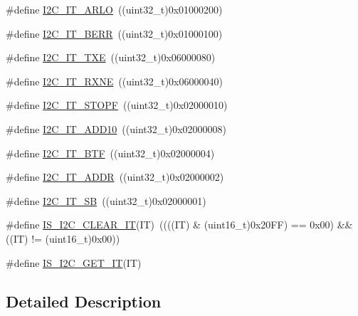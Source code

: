 \begin{DoxyCompactItemize}
\#define \mbox{\hyperlink{group___i2_c__interrupts__definition_ga2439154bee2a45a4147921cec18177d1}{I2\+C\+\_\+\+I\+T\+\_\+\+A\+R\+LO}}~((uint32\+\_\+t)0x01000200)
\item 
\#define \mbox{\hyperlink{group___i2_c__interrupts__definition_gad9aec016c98df6dbb95a5c10b180c202}{I2\+C\+\_\+\+I\+T\+\_\+\+B\+E\+RR}}~((uint32\+\_\+t)0x01000100)
\item 
\#define \mbox{\hyperlink{group___i2_c__interrupts__definition_gacb41229da2cd9460c3272cfb13aa29d3}{I2\+C\+\_\+\+I\+T\+\_\+\+T\+XE}}~((uint32\+\_\+t)0x06000080)
\item 
\#define \mbox{\hyperlink{group___i2_c__interrupts__definition_gac95135720c0de2fd01c44c3f7b6c81d4}{I2\+C\+\_\+\+I\+T\+\_\+\+R\+X\+NE}}~((uint32\+\_\+t)0x06000040)
\item 
\#define \mbox{\hyperlink{group___i2_c__interrupts__definition_ga741e098abb485b327c7668518117e415}{I2\+C\+\_\+\+I\+T\+\_\+\+S\+T\+O\+PF}}~((uint32\+\_\+t)0x02000010)
\item 
\#define \mbox{\hyperlink{group___i2_c__interrupts__definition_ga8a9bc5a1dee3bbd41347b19cf117c0f3}{I2\+C\+\_\+\+I\+T\+\_\+\+A\+D\+D10}}~((uint32\+\_\+t)0x02000008)
\item 
\#define \mbox{\hyperlink{group___i2_c__interrupts__definition_gaef469fef934f655614b7cffd00b87ceb}{I2\+C\+\_\+\+I\+T\+\_\+\+B\+TF}}~((uint32\+\_\+t)0x02000004)
\item 
\#define \mbox{\hyperlink{group___i2_c__interrupts__definition_gaf68f1eda33dcb13626597f477d044025}{I2\+C\+\_\+\+I\+T\+\_\+\+A\+D\+DR}}~((uint32\+\_\+t)0x02000002)
\item 
\#define \mbox{\hyperlink{group___i2_c__interrupts__definition_gaec2fb9bbd0e1b128b4450b2a7b312896}{I2\+C\+\_\+\+I\+T\+\_\+\+SB}}~((uint32\+\_\+t)0x02000001)
\item 
\#define \mbox{\hyperlink{group___i2_c__interrupts__definition_ga368c05fc9aadd7bb4d23280791b5a751}{I\+S\+\_\+\+I2\+C\+\_\+\+C\+L\+E\+A\+R\+\_\+\+IT}}(IT)~((((IT) \& (uint16\+\_\+t)0x20\+F\+F) == 0x00) \&\& ((\+I\+T) != (uint16\+\_\+t)0x00))
\item 
\#define \mbox{\hyperlink{group___i2_c__interrupts__definition_gab3d113f3d6b6e6f7896c5d7a8d8c2d01}{I\+S\+\_\+\+I2\+C\+\_\+\+G\+E\+T\+\_\+\+IT}}(IT)
\end{DoxyCompactItemize}


\subsection{Detailed Description}



